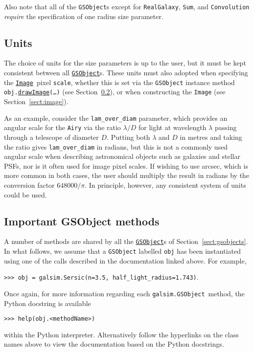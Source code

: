 \documentclass[preprint,10pt]{../../devel/modules/aastex}
\newcommand\GSObject{\href{http://galsim-developers.github.io/GalSim/classgalsim_1_1base_1_1_g_s_object.html}{\texttt{GSObject}}}
\newcommand\drawImage{\href{http://galsim-developers.github.io/GalSim/classgalsim_1_1base_1_1_g_s_object.html\#aafe6ca9d84fe81543fbc105b897273db}{\texttt{drawImage}}}
\newcommand\Image{\href{http://galsim-developers.github.io/GalSim/classgalsim_1_1image_1_1_image.html}{\texttt{Image}}}
\begin{document}
Also note that all of the \texttt{GSObject}s except for \texttt{RealGalaxy}, \texttt{Sum}, and
\texttt{Convolution} {\em require} the specification of one radius size
parameter.

\subsection{Units}
The choice of units for the size parameters is up to the user,
but it must be kept consistent between all \GSObject s.  These
units must also adopted when specifying the \Image\ pixel
\texttt{scale}, whether this is set via the \texttt{GSObject}
instance method \texttt{obj.}\drawImage\texttt{(\dots)}
(see Section~\ref{sect:gsobjectmethods}),
or when constructing the \texttt{Image} (see Section~\ref{sect:image}).

As an example, consider the
\texttt{lam\_over\_diam} parameter, which provides an angular scale for
the \texttt{Airy} via
the ratio $\lambda / D$ for light at wavelength $\lambda$ passing
through a telescope of diameter $D$. Putting both $\lambda$ and
$D$ in metres and taking the ratio gives \texttt{lam\_over\_diam} in
radians, but this is not a commonly used angular scale when describing
astronomical objects such as galaxies and stellar PSFs, nor is
it often used for image pixel scales.  If wishing to use arcsec, which
is more common in both cases, the user should multiply the result in
radians by the conversion factor
$648000 / \pi$.  In principle, however, any consistent
system of units could be used.


\subsection{Important GSObject methods}\label{sect:gsobjectmethods}
A number of methods are shared by all the \GSObject s of
Section~\ref{sect:gsobjects}.
In what follows, we assume that a
\texttt{GSObject} labelled \texttt{obj} has been instantiated using
one of the calls described in the documentation linked above.  For
example,

\texttt{>>> obj = galsim.Sersic(n=3.5, half\_light\_radius=1.743)}.

Once again, for more information regarding each \texttt{galsim.GSObject}~method,
the Python docstring is available

\texttt{>>> help(obj.<methodName>)}

within the Python interpreter.  Alternatively follow the hyperlinks on
the class names above to view the documentation based
on the Python docstrings.
\end{document}
